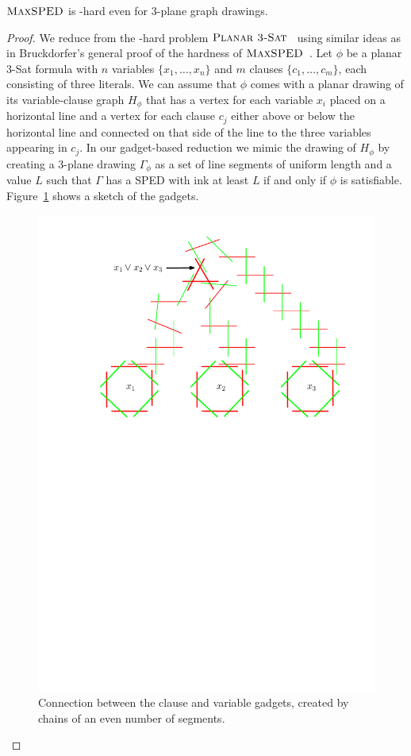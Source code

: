 \documentclass[a4paper,english,numberwithinsect]{eurocg18}
\newcommand{\maxsped}{\ensuremath{\textsc{MaxSPED}}\xspace}
\newcommand{\ppsat}{\ensuremath{\textsc{Planar 3-Sat}}\xspace}
\begin{document}
\begin{theorem}\label{thm:hard}
	\maxsped is \NP-hard even for 3-plane graph drawings.
\end{theorem}

\begin{proof}
	We reduce from the \NP-hard problem \ppsat~\cite{l-pftu-82} using similar ideas as in Bruckdorfer's general proof of the hardness of \maxsped~\cite{b-sgh-15}. %
	Let $\phi$ be a planar 3-Sat formula with $n$ variables $\{x_1, \dots, x_n\}$ and $m$ clauses $\{c_1, \dots, c_m\}$, each consisting of three literals.
	We can assume that $\phi$ comes with a planar drawing of its variable-clause graph $H_\phi$ that has a vertex for each variable $x_i$ placed on a horizontal line and a vertex for each clause $c_j$ either above or below the horizontal line and connected on that side of the line to the three variables appearing in $c_j$. 
	In our gadget-based reduction we mimic the drawing of $H_\phi$ by creating a 3-plane drawing $\Gamma_\phi$ as a set of line segments of uniform length and a value $L$ such that $\Gamma$ has a SPED with ink at least $L$ if and only if $\phi$ is satisfiable.
	Figure~\ref{fig:gadget_connection} shows a sketch of the gadgets.
	
	\begin{figure}
		\centering
		\includegraphics[width=.5\linewidth]{variable_clause_connection}
		\caption{Connection between the clause and variable gadgets, created by chains of an even number of segments.}
		\label{fig:gadget_connection}
	\end{figure}
	

\end{proof}
\end{document}
